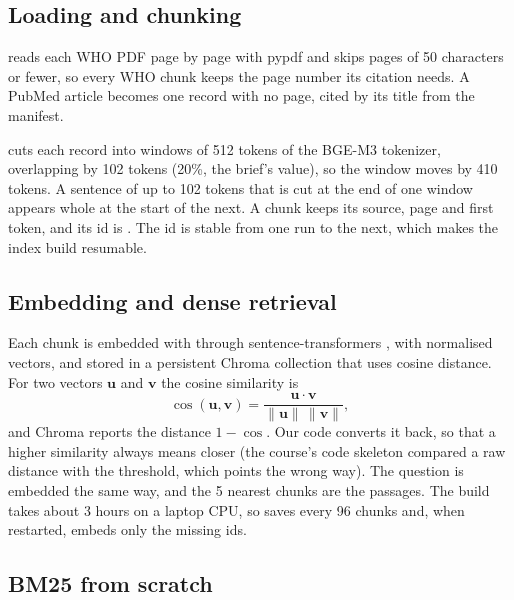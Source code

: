 \subsection{Loading and chunking}
\label{sec:ingest}

 reads each WHO PDF page by page with pypdf and skips pages of 50 characters or fewer, so every WHO chunk keeps the page number its citation needs. A PubMed article becomes one record with no page, cited by its title from the manifest.

 cuts each record into windows of 512 tokens of the BGE-M3 tokenizer, overlapping by 102 tokens (20\%, the brief's value), so the window moves by 410 tokens. A sentence of up to 102 tokens that is cut at the end of one window appears whole at the start of the next. A chunk keeps its source, page and first token, and its id is . The id is stable from one run to the next, which makes the index build resumable.

\subsection{Embedding and dense retrieval}

Each chunk is embedded with  \citep{chen2024bgem3,bgem3card} through sentence-transformers \citep{reimers2019sbert}, with normalised vectors, and stored in a persistent Chroma collection \citep{chroma} that uses cosine distance. For two vectors $\mathbf{u}$ and $\mathbf{v}$ the cosine similarity is
\begin{equation}
\cos(\mathbf{u},\mathbf{v}) = \frac{\mathbf{u}\cdot\mathbf{v}}{\lVert\mathbf{u}\rVert\,\lVert\mathbf{v}\rVert},
\end{equation}
and Chroma reports the distance $1-\cos$. Our code converts it back, so that a higher similarity always means closer (the course's code skeleton compared a raw distance with the threshold, which points the wrong way). The question is embedded the same way, and the 5 nearest chunks are the passages. The build takes about 3 hours on a laptop CPU, so  saves every 96 chunks and, when restarted, embeds only the missing ids.

\subsection{BM25 from scratch}

